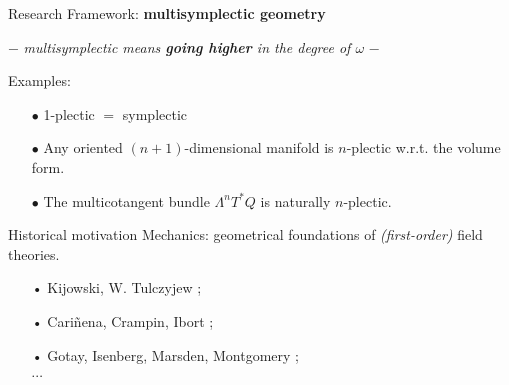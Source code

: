 \documentclass[handout,10pt]{beamer}
\begin{document}
\begin{frame}[t, fragile]{Research Framework:  \textbf{multisymplectic geometry}} %
	\begin{center}
		$-$ \emph{multisymplectic means \textbf{going higher} in the degree of $\omega$} $-$
	\end{center}
	\pause
	\begin{defblock}
			
	\end{defblock}
	\vfill
	\pause
	\begin{block}{Examples:}
		\begin{itemize}
			\item[$\bullet$] 1-plectic $=$ symplectic
			\item[$\bullet$] Any oriented $(n+1)$-dimensional manifold is $n$-plectic w.r.t. the volume form.
			\item[$\bullet$] The multicotangent bundle $\Lambda^n T^\ast Q$ is naturally $n$-plectic.
		\end{itemize}
	\end{block}			 
%
	\pause
	\begin{block}{Historical motivation}
		Mechanics: geometrical foundations of \textit{(first-order)} field theories.
		\begin{itemize}
		 \item[•] Kijowski, W. Tulczyjew \cite{Kijowski1979}; %
		 \item[•] Cariñena, Crampin, Ibort \cite{Carinena1991b};%
		 \item[•] Gotay, Isenberg, Marsden, Montgomery \cite{Gimmsy1};%
		 \\ $\cdots$
		\end{itemize}
	\end{block}
\end{frame}
\end{document}
